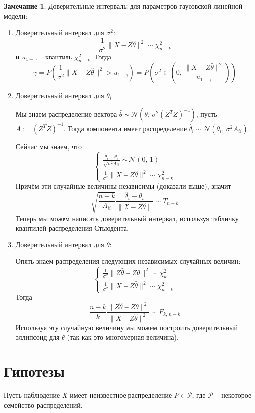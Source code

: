 \documentclass[a4paper,12pt]{article}
\theoremstyle{plain}
\theoremstyle{definition}
\newtheorem*{note}{Замечание}
\theoremstyle{remark}
\begin{document}
\begin{note}
  Доверительные интервалы для параметров гаусовской линейной модели:
  \begin{enumerate}
    \item Доверительный интервал для $\sigma^2$:
    \[
      \frac{1}{\sigma^2}\|X - Z\hat{\theta}\|^2 \sim \chi^2_{n - k}
    \]
    и $u_{1 - \gamma}$ -- квантиль $\chi^2_{n - k}$. Тогда
    \[
      \gamma = P\left(\frac{1}{\sigma^2}\|X - Z\hat{\theta}\|^2 > u_{1 - \gamma}\right) = P\left(\sigma^2 \in \left(0,\, \frac{\|X - Z\hat{\theta}\|^2}{u_{1 - \gamma}}\right)\right)
    \]
    \item Доверительный интервал для $\theta_i$
    
    Мы знаем распределение вектора $\hat{\theta} \sim \mathcal{N}(\theta,\, \sigma^2(Z^TZ)^{-1})$, пусть $A := (Z^TZ)^{-1}$. Тогда компонента имеет распределение $\hat{\theta}_i \sim \mathcal{N}(\theta_i,\, \sigma^2A_{ii})$.

    Сейчас мы знаем, что
    \[
      \begin{cases}
        \frac{\hat{\theta}_i - \theta_i}{\sqrt{\sigma^2A_{ii}}} \sim \mathcal{N}(0,\,1)\\
        \frac{1}{\sigma^2}\|X - Z\hat{\theta}\|^2 \sim \chi^2_{n - k}  
      \end{cases}
    \]
    Причём эти случайные величины независимы (доказали выше), значит
    \[
      \sqrt{\frac{n - k}{A_{ii}}}\frac{\hat{\theta}_i - \theta_i}{\|X - Z\hat{\theta}\|} \sim T_{n - k}
    \]
    Теперь мы можем написать доверительный интервал, используя табличку квантилей распределения Стьюдента.
    \item Доверительный интервал для $\theta$:
    
    Опять знаем распределения следующих независимых случайных величин:
    \[
      \begin{cases}
        \frac{1}{\sigma^2}\|Z\hat{\theta} - Z\theta\|^2 \sim \chi^2_k\\
        \frac{1}{\sigma^2}\|X - Z\hat{\theta}\|^2 \sim \chi^2_{n - k}
      \end{cases}
    \]
    Тогда
    \[
      \frac{n - k}{k}\frac{\|Z\hat{\theta} - Z\theta\|^2}{\|X - Z\hat{\theta}\|^2} \sim F_{k,\, n-k}
    \]
    Используя эту случайную величину мы можем построить доверительный эллипсоид для $\theta$ (так как это многомерная величина).
  \end{enumerate}
\end{note}

\section{Гипотезы}
Пусть наблюдение $X$ имеет неизвестное распределение $P \in \mathcal{P}$, где $\mathcal{P}$ -- некоторое семейство распределений.
\end{document}
